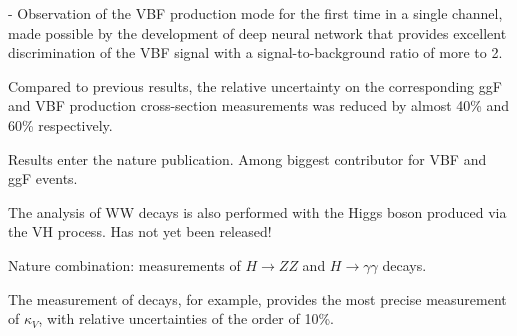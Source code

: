 - Observation of the VBF production mode for the first time in a single channel, made possible by the development of deep neural network that provides excellent discrimination of the VBF signal with a signal-to-background ratio of more to 2. 

Compared to previous \RunTwo results, the relative uncertainty on the corresponding ggF and VBF production cross-section measurements was reduced by almost 40\% and 60\% respectively. 

Results enter the nature publication. 
Among biggest contributor for VBF and ggF events. 


The analysis of WW decays is also performed with the Higgs boson produced via the VH process. 
Has not yet been released!


Nature combination: measurements of $H \to ZZ$ and $H \to \gamma\gamma$ decays. 

The measurement of \HWW decays, for example, provides the most precise measurement of $\kappa_{V}$, with relative uncertainties of the order of 10\%.

